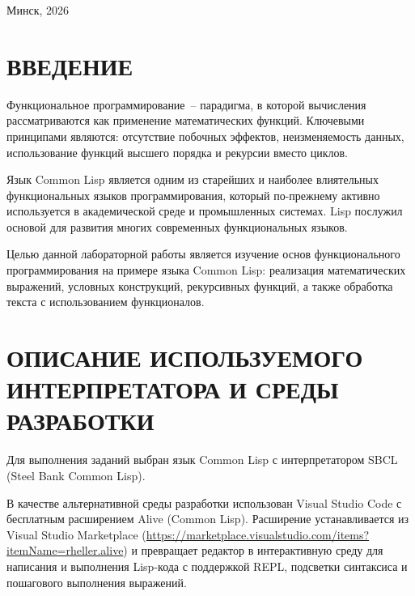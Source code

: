\documentclass[14pt,a4paper]{extarticle}
\begin{document}
\vfill

\begin{center}
Минск, 2026
\end{center}

\newpage

\tableofcontents
\newpage

\section*{ВВЕДЕНИЕ}

Функциональное программирование~-- парадигма, в которой вычисления рассматриваются как применение математических функций. Ключевыми принципами являются: отсутствие побочных эффектов, неизменяемость данных, использование функций высшего порядка и рекурсии вместо циклов.

Язык Common Lisp является одним из старейших и наиболее влиятельных функциональных языков программирования, который по-прежнему активно используется в академической среде и промышленных системах. Lisp послужил основой для развития многих современных функциональных языков.

Целью данной лабораторной работы является изучение основ функционального программирования на примере языка Common Lisp: реализация математических выражений, условных конструкций, рекурсивных функций, а также обработка текста с использованием функционалов.

\newpage

\section{ОПИСАНИЕ ИСПОЛЬЗУЕМОГО ИНТЕРПРЕТАТОРА И СРЕДЫ РАЗРАБОТКИ}

Для выполнения заданий выбран язык Common Lisp с интерпретатором SBCL (Steel Bank Common Lisp).

В качестве альтернативной среды разработки использован Visual Studio Code с бесплатным расширением Alive (Common Lisp). Расширение устанавливается из Visual Studio Marketplace (\url{https://marketplace.visualstudio.com/items?itemName=rheller.alive}) и превращает редактор в интерактивную среду для написания и выполнения Lisp-кода с поддержкой REPL, подсветки синтаксиса и пошагового выполнения выражений.
\end{document}
